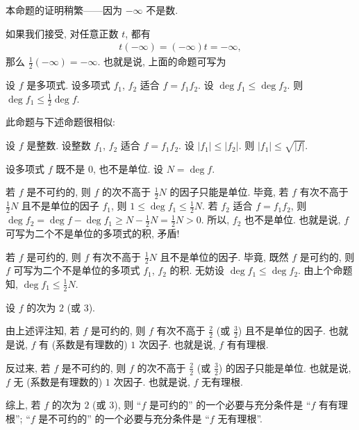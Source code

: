 \begin{remark}
    本命题的证明稍繁——因为 $-\infty$ 不是数.
\end{remark}

如果我们接受, 对任意正数 $t$, 都有
\begin{align*}
    t (-\infty) = (-\infty) t = -\infty,
\end{align*}
那么 $\frac{1}{2} (-\infty) = -\infty$. 也就是说, 上面的命题可写为
\begin{proposition}
    设 $f$ 是多项式. 设多项式 $f_1$, $f_2$ 适合 $f = f_1 f_2$. 设 $\deg f_1 \leq \deg f_2$. 则 $\deg f_1 \leq \frac{1}{2} \deg f$.
\end{proposition}

\begin{remark}
    此命题与下述命题很相似:

    设 $f$ 是整数. 设整数 $f_1$, $f_2$ 适合 $f = f_1 f_2$. 设 $|f_1| \leq |f_2|$. 则 $|f_1| \leq \sqrt{|f|}$.
\end{remark}

\begin{remark}
    设多项式 $f$ 既不是 $0$, 也不是单位. 设 $N = \deg f$.

    若 $f$ 是不可约的, 则 $f$ 的次不高于 $\frac{1}{2} N$ 的因子只能是单位. 毕竟, 若 $f$ 有次不高于 $\frac{1}{2} N$ 且不是单位的因子 $f_1$, 则 $1 \leq \deg f_1 \leq \frac{1}{2} N$. 若 $f_2$ 适合 $f = f_1 f_2$, 则 $\deg f_2 = \deg f - \deg f_1 \geq N - \frac{1}{2} N = \frac{1}{2} N > 0$. 所以, $f_2$ 也不是单位. 也就是说, $f$ 可写为二个不是单位的多项式的积, 矛盾!

    若 $f$ 是可约的, 则 $f$ 有次不高于 $\frac{1}{2} N$ 且不是单位的因子. 毕竟, 既然 $f$ 是可约的, 则 $f$ 可写为二个不是单位的多项式 $f_1$, $f_2$ 的积. 无妨设 $\deg f_1 \leq \deg f_2$. 由上个命题知, $\deg f_1 \leq \frac{1}{2} N$.
\end{remark}

\begin{remark}
    设 $f$ 的次为 $2$ (或 $3$).

    由上述评注知, 若 $f$ 是可约的, 则 $f$ 有次不高于 $\frac{2}{2}$ (或 $\frac{3}{2}$) 且不是单位的因子. 也就是说, $f$ 有 (系数是有理数的) $1$ 次因子. 也就是说, $f$ 有有理根.

    反过来, 若 $f$ 是不可约的, 则 $f$ 的次不高于 $\frac{2}{2}$ (或 $\frac{3}{2}$) 的因子只能是单位. 也就是说, $f$ 无 (系数是有理数的) $1$ 次因子. 也就是说, $f$ 无有理根.

    综上, 若 $f$ 的次为 $2$ (或 $3$), 则 ``$f$ 是可约的'' 的一个必要与充分条件是 ``$f$ 有有理根''; ``$f$ 是不可约的'' 的一个必要与充分条件是 ``$f$ 无有理根''.
\end{remark}

